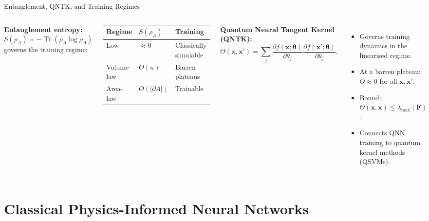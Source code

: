 \documentclass[aspectratio=169,11pt]{beamer}
\newcommand{\bx}{\mathbf{x}}
\newcommand{\btheta}{\boldsymbol{\theta}}
\newcommand{\QFI}{\mathbf{F}}
\newcommand{\Tr}{\operatorname{Tr}}
\begin{document}
\begin{frame}{Entanglement, QNTK, and Training Regimes}
  \begin{columns}[T]
    \textbf{Entanglement entropy:}
    $S(\rho_A) = -\Tr(\rho_A\log\rho_A)$
    governs the training regime:

    \begin{center}
    \begin{tabular}{lll}
      \toprule
      Regime & $S(\rho_A)$ & Training \\
      \midrule
      Low & $\approx0$ & Classically simulable \\
      Volume-law & $\Theta(n)$ & Barren plateaus \\
      Area-law & $O(|\partial A|)$ & Trainable \\
      \bottomrule
    \end{tabular}
    \end{center}

    \textbf{Quantum Neural Tangent Kernel (QNTK):}
    \[
      \Theta(\bx,\bx')
      = \sum_j
        \frac{\partial f(\bx;\btheta)}{\partial\theta_j}
        \frac{\partial f(\bx';\btheta)}{\partial\theta_j}.
    \]
    \begin{itemize}
      \item Governs training dynamics in the linearised
            regime.
      \item At a barren plateau:
            $\Theta\approx 0$ for all $\bx,\bx'$.
      \item Bound: $\Theta(\bx,\bx)
            \leq\lambda_{\max}(\QFI)$.
      \item Connects QNN training to quantum kernel
            methods (QSVMs).
    \end{itemize}
  \end{columns}
\end{frame}

\section{Classical Physics-Informed Neural Networks}
\end{document}
